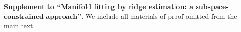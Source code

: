 \documentclass[aos,preprint]{imsart}
\theoremstyle{remark}
\begin{document}
\begin{supplement}
\textbf{Supplement to ``Manifold fitting by ridge estimation: a subspace-constrained approach''}\cite{supplement}. We include all materials of proof omitted from the main text.
\end{supplement}



\end{document}
